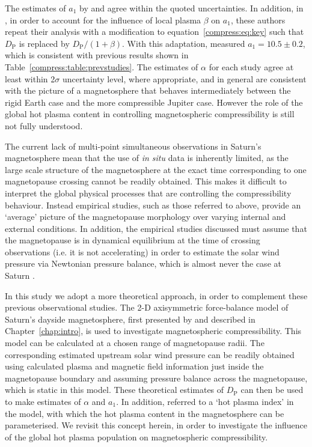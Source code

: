 The estimates of $a_1$ by \citet{arridge2006} and \citet{kanani2010} agree within the quoted uncertainties. In addition, in \citet{pilkington2015}, in order to account for the influence of local plasma $\beta$ on $a_1$, these authors repeat their analysis with a modification to equation~\ref{compress:eq:key} such that $D_\mathrm{P}$ is replaced by $D_\mathrm{P}/(1+\beta)$. With this adaptation, \citet{pilkington2015} measured $a_1 = 10.5 \pm 0.2$, which is consistent with previous results shown in Table~\ref{compress:table:prevstudies}. The estimates of $\alpha$ for each study agree at least within 2$\sigma$ uncertainty level, where appropriate, and in general are consistent with the picture of a magnetosphere that behaves intermediately between the rigid Earth case and the more compressible Jupiter case. However the role of the global hot plasma content in controlling magnetospheric compressibility is still not fully understood.

The current lack of multi-point simultaneous observations in Saturn's magnetosphere mean that the use of \textit{in situ} data is inherently limited, as the large scale structure of the magnetosphere at the exact time corresponding to one magnetopause crossing cannot be readily obtained. This makes it difficult to interpret the global physical processes that are controlling the compressibility behaviour. Instead empirical studies, such as those referred to above, provide an `average' picture of the magnetopause morphology over varying internal and external conditions. In addition, the empirical studies discussed must assume that the magnetopause is in dynamical equilibrium at the time of crossing observations (i.e. it is not accelerating) in order to estimate the solar wind pressure via Newtonian pressure balance, which is almost never the case at Saturn \cite[e.g.][]{dougherty2005,masters2011,pilkington2015}.

In this study we adopt a more theoretical approach, in order to complement these previous observational studies. The 2-D axisymmetric force-balance model of Saturn's dayside magnetosphere, first presented by \citet{achilleos2010a} and described in Chapter~\ref{chap:intro}, is used to investigate magnetospheric compressibility. This model can be calculated at a chosen range of magnetopause radii. The corresponding estimated upstream solar wind pressure can be readily obtained using calculated plasma and magnetic field information just inside the magnetopause boundary and assuming pressure balance across the magnetopause, which is static in this model. These theoretical estimates of $D_\mathrm{P}$ can then be used to make estimates of $\alpha$ and $a_1$. In addition, \citet{achilleos2010a} referred to a `hot plasma index' in the model, with which the hot plasma content in the magnetosphere can be parameterised. We revisit this concept herein, in order to investigate the influence of the global hot plasma population on magnetospheric compressibility.

